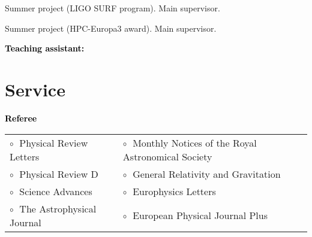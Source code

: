 \documentclass[a4paper]{moderncv}
\begin{document}
\vspace{0.1cm}
\vspace{-0.1cm}
\vspace{-0.0cm}
\hspace{0.8cm}Summer project (LIGO SURF program). Main supervisor.
\vspace{-0.0cm}

\vspace{0.1cm}
\vspace{-0.1cm}
\vspace{-0.0cm}
\hspace{0.8cm}Summer project (HPC-Europa3 award). Main supervisor.
\vspace{-0.0cm}


%
\vspace{0.2cm}
\textbf{\textcolor{black}{Teaching assistant:}}\vspace{0.05cm}\\
 \vspace{-0.1cm}


\section{Service}

\textbf{\textcolor{black}{Referee}}\vspace{0.1cm}\\
\begin{tabular}{@{\hskip 0.4cm}l@{\hskip 0.4in}l}
$\circ\;$ Physical Review Letters & $\circ\;$ Monthly Notices of the Royal Astronomical Society \\
$\circ\;$ Physical Review D & $\circ\;$ General Relativity and Gravitation \\
$\circ\;$ Science Advances & $\circ\;$ Europhysics Letters \\
$\circ\;$ The Astrophysical Journal &  $\circ\;$ European Physical Journal Plus
\end{tabular}
\vspace{+0.15cm}
 
\end{document}
